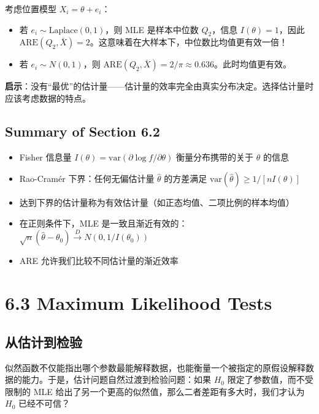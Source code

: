 \begin{example}\label{ex:median-mean-are}
考虑位置模型 $X_i = \theta + e_i$：

\begin{itemize}
\item[(a)] 若 $e_i \sim \text{Laplace}(0,1)$，则 MLE 是样本中位数 $Q_2$，信息 $I(\theta) = 1$，因此 $\text{ARE}(Q_2, \bar{X}) = 2$。这意味着在大样本下，中位数比均值更有效一倍！
\item[(b)] 若 $e_i \sim N(0,1)$，则 $\text{ARE}(Q_2, \bar{X}) = 2/\pi \approx 0.636$。此时均值更有效。
\end{itemize}

\textbf{启示}：没有``最优''的估计量——估计量的效率完全由真实分布决定。选择估计量时应该考虑数据的特点。
\end{example}

\subsection{Summary of Section 6.2}

\begin{itemize}
\item Fisher 信息量 $I(\theta) = \text{var}(\partial \log f/\partial \theta)$ 衡量分布携带的关于 $\theta$ 的信息
\item Rao-Cramér 下界：任何无偏估计量 $\widehat{\theta}$ 的方差满足 $\text{var}(\widehat{\theta}) \geq 1/[nI(\theta)]$
\item 达到下界的估计量称为有效估计量（如正态均值、二项比例的样本均值）
\item 在正则条件下，MLE 是一致且渐近有效的：$\sqrt{n}(\widehat{\theta} - \theta_0) \xrightarrow{D} N(0, 1/I(\theta_0))$
\item ARE 允许我们比较不同估计量的渐近效率
\end{itemize}

\section{6.3 Maximum Likelihood Tests}\label{sec:6.3}

\subsection{从估计到检验}

似然函数不仅能指出哪个参数最能解释数据，也能衡量一个被指定的原假设解释数据的能力。于是，估计问题自然过渡到检验问题：如果 $H_0$ 限定了参数值，而不受限制的 MLE 给出了另一个更高的似然值，那么二者差距有多大时，我们才认为 $H_0$ 已经不可信？

